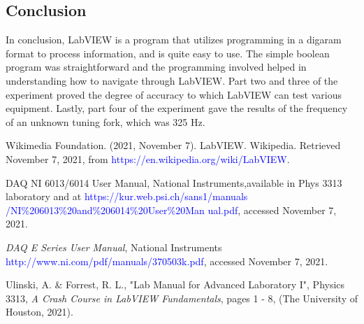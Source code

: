 \documentclass[twoside,10pt]{article}
\begin{document}
\begin{multicols}{2}
		\section{Conclusion}
		In conclusion, LabVIEW is a program that utilizes programming in a digaram format to process information, and is quite easy to use. The simple boolean program was straightforward and the programming involved helped in understanding how to navigate through LabVIEW. Part two and three of the experiment proved the degree of accuracy to which LabVIEW can test various equipment. Lastly, part four of the experiment gave the results of the frequency of an unknown tuning fork, which was 325 Hz. 

		
		
		\begin{thebibliography}{99} %
			\raggedright
			
	\begin{small}
	Wikimedia Foundation. (2021, November 7). LabVIEW. Wikipedia. Retrieved November 7, 2021, from \textcolor{blue}{https://en.wikipedia.org/wiki/LabVIEW}. 

	DAQ NI 6013/6014 User Manual, National Instruments,available in Phys 3313 laboratory and at \textcolor{blue}{https://kur.web.psi.ch/sans1/manuals
	/NI\%206013\%20and\%206014\%20User\%20Man
	ual.pdf}, accessed November 7, 2021.
	
	\textit{DAQ E Series User Manual}, National Instruments \textcolor{blue}{http://www.ni.com/pdf/manuals/370503k.pdf}, accessed November 7, 2021.

	Ulinski, A. \& Forrest, R. L., "Lab Manual for Advanced Laboratory I", Physics 3313, \textit{A Crash Course in LabVIEW Fundamentals}, pages 1 - 8, (The University of Houston, 2021).
	
\end{small}

	
\end{thebibliography}
		
		
	\end{multicols}
	
\end{document}
